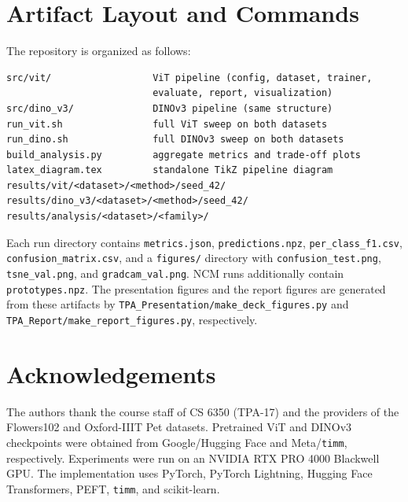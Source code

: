 \documentclass[journal,11pt]{IEEEtran}
\begin{document}
\clearpage
\section{Artifact Layout and Commands}
\label{app:artifacts}
The repository is organized as follows:
\begin{verbatim}
src/vit/                  ViT pipeline (config, dataset, trainer,
                          evaluate, report, visualization)
src/dino_v3/              DINOv3 pipeline (same structure)
run_vit.sh                full ViT sweep on both datasets
run_dino.sh               full DINOv3 sweep on both datasets
build_analysis.py         aggregate metrics and trade-off plots
latex_diagram.tex         standalone TikZ pipeline diagram
results/vit/<dataset>/<method>/seed_42/
results/dino_v3/<dataset>/<method>/seed_42/
results/analysis/<dataset>/<family>/
\end{verbatim}

\begin{sloppypar}
Each run directory contains \texttt{metrics.json}, \texttt{predictions.npz}, \texttt{per\_class\_f1.csv}, \texttt{confusion\_matrix.csv}, and a \texttt{figures/} directory with \texttt{confusion\_test.png}, \texttt{tsne\_val.png}, and \texttt{gradcam\_val.png}. NCM runs additionally contain \texttt{prototypes.npz}. The presentation figures and the report figures are generated from these artifacts by \texttt{TPA\_Presentation/make\_deck\_figures.py} and \texttt{TPA\_Report/make\_report\_figures.py}, respectively.
\end{sloppypar}

\section*{Acknowledgements}
The authors thank the course staff of CS 6350 (TPA-17) and the providers of the Flowers102 and Oxford-IIIT Pet datasets. Pretrained ViT and DINOv3 checkpoints were obtained from Google/Hugging Face and Meta/\texttt{timm}, respectively. Experiments were run on an NVIDIA RTX PRO 4000 Blackwell GPU. The implementation uses PyTorch, PyTorch Lightning, Hugging Face Transformers, PEFT, \texttt{timm}, and scikit-learn.
\end{document}
